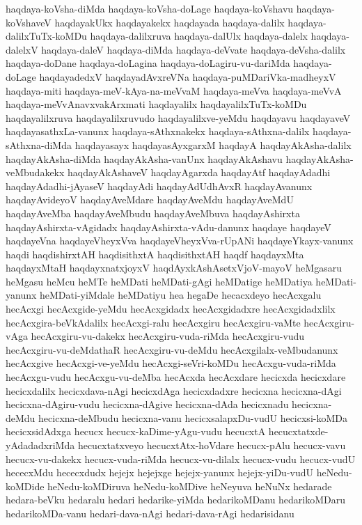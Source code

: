 {haqdaya-koVsha-diMda
haqdaya-koVsha-doLage
haqdaya-koVshavu
haqdaya-koVshaveV
haqdayakUkx
haqdayakekx
haqdayada
haqdaya-dalilx
haqdaya-dalilxTuTx-koMDu
haqdaya-dalilxruva
haqdaya-dalUlx
haqdaya-dalelx
haqdaya-dalelxV
haqdaya-daleV
haqdaya-diMda
haqdaya-deVvate
haqdaya-deVsha-dalilx
haqdaya-doDane
haqdaya-doLagina
haqdaya-doLagiru-vu-dariMda
haqdaya-doLage
haqdayadedxV
haqdayadAvxreVNa
haqdaya-puMDariVka-madheyxV
haqdaya-miti
haqdaya-meV-kAya-na-meVvaM
haqdaya-meVva
haqdaya-meVvA
haqdaya-meVvAnavxvakArxmati
haqdayalilx
haqdayalilxTuTx-koMDu
haqdayalilxruva
haqdayalilxruvudo
haqdayalilxve-yeMdu
haqdayavu
haqdayaveV
haqdayasathxLa-vanunx
haqdaya-sAthxnakekx
haqdaya-sAthxna-dalilx
haqdaya-sAthxna-diMda
haqdayasayx
haqdayasAyxgarxM
haqdayA
haqdayAkAsha-dalilx
haqdayAkAsha-diMda
haqdayAkAsha-vanUnx
haqdayAkAshavu
haqdayAkAsha-veMbudakekx
haqdayAkAshaveV
haqdayAgarxda
haqdayAtf
haqdayAdadhi
haqdayAdadhi-jAyaseV
haqdayAdi
haqdayAdUdhAvxR
haqdayAvanunx
haqdayAvideyoV
haqdayAveMdare
haqdayAveMdu
haqdayAveMdU
haqdayAveMba
haqdayAveMbudu
haqdayAveMbuva
haqdayAshirxta
haqdayAshirxta-vAgidadx
haqdayAshirxta-vAdu-danunx
haqdaye
haqdayeV
haqdayeVna
haqdayeVheyxVva
haqdayeVheyxVva-rUpANi
haqdayeYkayx-vanunx
haqdi
haqdishirxtAH
haqdisithxtA
haqdisithxtAH
haqdf
haqdayxMta
haqdayxMtaH
haqdayxnatxjoyxV
haqdAyxkAshAsetxVjoV-mayoV
heMgasaru
heMgasu
heMcu
heMTe
heMDati
heMDati-gAgi
heMDatige
heMDatiya
heMDati-yanunx
heMDati-yiMdale
heMDatiyu
hea
hegaDe
hecacxdeyo
hecAcxgalu
hecAcxgi
hecAcxgide-yeMdu
hecAcxgidadx
hecAcxgidadxre
hecAcxgidadxlilx
hecAcxgira-beVkAdalilx
hecAcxgi-ralu
hecAcxgiru
hecAcxgiru-vaMte
hecAcxgiru-vAga
hecAcxgiru-vu-dakekx
hecAcxgiru-vuda-riMda
hecAcxgiru-vudu
hecAcxgiru-vu-deMdathaR
hecAcxgiru-vu-deMdu
hecAcxgilalx-veMbudanunx
hecAcxgive
hecAcxgi-ve-yeMdu
hecAcxgi-seVri-koMDu
hecAcxgu-vuda-riMda
hecAcxgu-vudu
hecAcxgu-vu-deMba
hecAcxda
hecAcxdare
hecicxda
hecicxdare
hecicxdalilx
hecicxdava-nAgi
hecicxdAga
hecicxdadxre
hecicxna
hecicxna-dAgi
hecicxna-dAgiru-vudu
hecicxna-dAgive
hecicxna-dAda
hecicxnadu
hecicxna-deMdu
hecicxna-deMbudu
hecicxna-vanu
hecicxsalapxDu-vudU
hecicxsi-koMDa
hecicxsidAdxga
hecucx
hecucx-kaDime-yAgu-vudu
hecucxtA
hecucxtatxde-yAdadadxriMda
hecucxtatxveyo
hecucxtAtx-hoVdare
hecucx-pAlu
hecucx-vavu
hecucx-vu-dakekx
hecucx-vuda-riMda
hecucx-vu-dilalx
hecucx-vudu
hecucx-vudU
hececxMdu
hececxdudx
hejejx
hejejxge
hejejx-yanunx
hejejx-yiDu-vudU
heNedu-koMDide
heNedu-koMDiruva
heNedu-koMDive
heNeyuva
heNuNx
hedarade
hedara-beVku
hedaralu
hedari
hedarike-yiMda
hedarikoMDanu
hedarikoMDaru
hedarikoMDa-vanu
hedari-dava-nAgi
hedari-dava-rAgi
hedarisidanu
}

